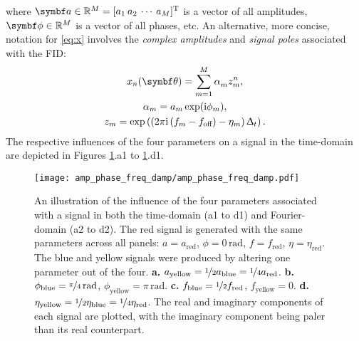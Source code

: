 where $\bda \in \mathbb{R}^M = [a_1 \hspace{2pt} a_2 \hspace{2pt} \cdots
\hspace{2pt} a_M]^{\mathrm{T}}$ is a vector of all amplitudes, $\bdphi \in
\mathbb{R}^M$ is a vector of all phases, etc.
An alternative, more concise, notation for \cref{eq:x}
involves the \emph{complex amplitudes} and \emph{signal poles} associated with
the \ac{FID}:
\begin{subequations}
    \begin{gather}
        x_n(\bth) = \sumM \alpha_m^{\vphantom{n}} z_m^n,\\
        \alpha_m = \amexpphim,\\
        z_m = \exp\left(
            \left(2 \pi \iu \left(f_m - \foff\right) - \eta_m\right) \Dt
        \right).\label{eq:signal-pole}
    \end{gather}
    \label{eq:x-alpha-z}%
\end{subequations}
The respective influences of the four parameters on a signal in the time-domain
are depicted in Figures \ref{fig:amp-phase-freq-damp}.a1 to
\ref{fig:amp-phase-freq-damp}.d1.
\begin{figure}
    \centering
    \texttt{[image: amp\_phase\_freq\_damp/amp\_phase\_freq\_damp.pdf]}
    \caption[
        An illustration of the influence of the four parameters associated
        with a signal in both the time-domain and the Fourier-domain.
    ]{
        An illustration of the influence of the four parameters associated
        with a signal in both the time-domain (a1 to d1) and Fourier-domain
        (a2 to d2).
        The red signal is generated with the same parameters across all panels:
        $a = a_{\text{red}}$, $\phi = 0\,\unit{\radian}$, $f = f_{\text{red}}$,  $\eta =
        \eta_{\text{red}}$.  The blue and yellow signals were produced by
        altering one parameter out of the four.
        \textbf{a.} $a_{\text{yellow}} = \nicefrac{1}{2} a_{\text{blue}} =
        \nicefrac{1}{4} a_{\text{red}}$.
        \textbf{b.}
        $\phi_{\text{blue}} = \nicefrac{\pi}{4}\,\unit{\radian}$,
        $\phi_{\text{yellow}} = \pi\,\unit{\radian}$.
        \textbf{c.}
        $f_{\text{blue}} = \nicefrac{1}{2} f_{\text{red}}$,
        $f_{\text{yellow}} = 0$.
        \textbf{d.}
        $\eta_{\text{yellow}} =
        \nicefrac{1}{2}\eta_{\text{blue}} =
        \nicefrac{1}{4}\eta_{\text{red}}$.
        The real and imaginary components of each signal are plotted, with the
        imaginary component being paler than its real counterpart.
    }
    \label{fig:amp-phase-freq-damp}%
\end{figure}

